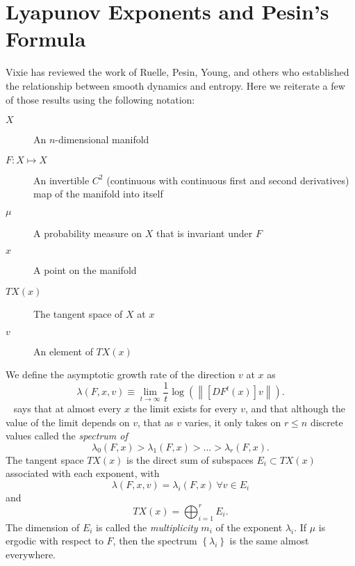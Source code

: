 \section{Lyapunov Exponents and Pesin's Formula}
\label{sec:PesinFormula}

Vixie\cite{vixie02} has reviewed the work of
Ruelle\cite{ruelle-1978-1}, Pesin\cite{pesin77},
Young\cite{young95-1}, and others who established the relationship
between smooth dynamics and entropy.  Here we reiterate a few of those
results using the following notation:
\begin{description}
\item[$X$] An $n$-dimensional manifold
\item[$F:X\mapsto X$] An invertible $C^2$ (continuous with continuous
  first and second derivatives) map of the manifold into itself
\item[$\mu$] A probability measure on $X$ that is invariant under $F$
\item[$x$] A point on the manifold
\item[$TX(x)$] The tangent space of $X$ at $x$
\item[$v$] An element of $TX(x)$
\end{description}

We define the asymptotic growth rate of the direction $v$ at $x$ as
\begin{equation}
  \label{eq:growthVX}
  \lambda(F,x,v) \equiv \lim_{t\rightarrow \infty} \frac{1}{t} \log
  \left( \left\| [DF^t(x)] v \right\| \right).
\end{equation}
 ~\cite{young95-1,katok95, mane87} says
that at almost every $x$ the limit exists for every $v$, and that
although the value of the limit depends on $v$, that as $v$ varies, it
only takes on $r \leq n$ discrete values called the \emph{spectrum of
  }
\begin{equation}
  \label{eq:LyapunovSpectrum}
  \lambda_0(F,x) > \lambda_1(F,x) > ... > \lambda_r(F,x).
\end{equation}
The tangent space $TX(x)$ is the direct sum of subspaces $E_i \subset
TX(x)$ associated with each exponent, with
\begin{equation*}
  \lambda(F,x,v) = \lambda_i(F,x) ~ \forall v \in E_i
\end{equation*}
and
\begin{equation*}
  TX(x) = \bigoplus_{i=1}^r E_i. %
\end{equation*}
The dimension of $E_i$ is called the \emph{multiplicity} $m_i$ of the
exponent $\lambda_i$. If $\mu$ is ergodic with respect to $F$, then
the spectrum $\left\{ \lambda_i \right\}$ is the same almost
everywhere.


